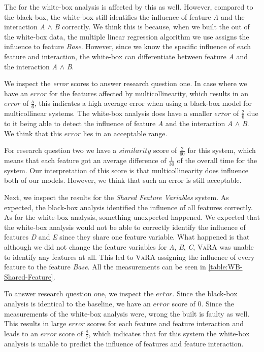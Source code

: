 The {\perfInfluenceModel} for the white-box analysis is affected by this as well.
However, compared to the black-box, the white-box still identifies the influence of feature \emph{A} and
the interaction \emph{A} $\land$ \emph{B} correctly. We think this is because, when we built the {\perfInfluenceModel} out of the white-box data,
the multiple linear regression algorithm we use assigns the influence to feature \emph{Base}.
However, since we know the specific influence of each feature and interaction,
the white-box can differentiate between feature \emph{A} and the interaction \emph{A} $\land$ \emph{B}.

We inspect the \emph{error} scores to answer research question one. In case where we have an $error$ for the features affected by multicollinearity,
which results in an $\overline{error}$ of $\frac{5}{6}$, this indicates a high average error when using a black-box model for multicollinear systems.
The white-box analysis does have a smaller $\overline{error}$ of $\frac{2}{6}$ due to it being able to detect the influence of feature \emph{A} and
the interaction \emph{A} $\land$ \emph{B}. We think that this $\overline{error}$ lies in an acceptable range.

For research question two we have a $\overline{similarity}$ score of $\frac{2}{60}$ for this system,
which means that each feature got an average difference of $\frac{1}{30}$ of the overall time for the system. 
Our interpretation of this score is that multicollinearity does influence both of our models. 
However, we think that such an error is still acceptable.

Next, we inspect the results for the \emph{Shared Feature Variables} system. 
As expected, the black-box analysis identified the influence of all features correctly. 
As for the white-box analysis, something unexpected happened. 
We expected that the white-box analysis would not be able to correctly identify the influence of features \emph{D} and \emph{E} since they share one
feature variable. What happened is that although we did not change the feature variables for \emph{A}, \emph{B}, \emph{C}, \textsc{VaRA} 
was unable to identify any features at all. This led to \textsc{VaRA} assigning the influence of every feature to the feature \emph{Base}.
All the measurements can be seen in \autoref{table:WB-Shared-Feature}.

To answer research question one, we inspect the $\overline{error}$. Since the black-box analysis is identical to the baseline, we have an 
$\overline{error}$ score of $0$. Since the measurements of the white-box analysis were, wrong the {\perfInfluenceModel} built
is faulty as well. This results in large $error$ scores for each feature and feature interaction and leads to an $\overline{error}$ score
of $\frac{8}{7}$, which indicates that for this system the white-box analysis is unable to predict the influence of features and feature interaction.

